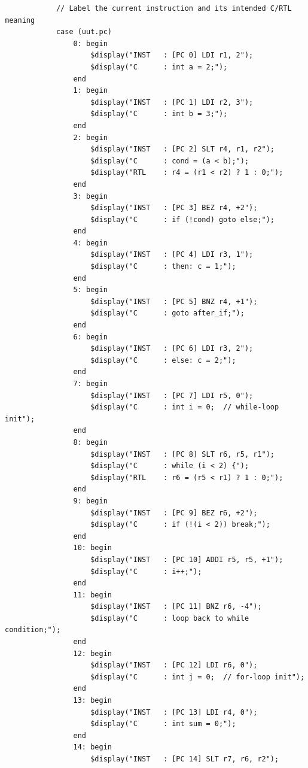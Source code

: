 \documentclass[12pt]{report}
\begin{document}
\begin{lstlisting}
            // Label the current instruction and its intended C/RTL meaning
            case (uut.pc)
                0: begin
                    $display("INST   : [PC 0] LDI r1, 2");
                    $display("C      : int a = 2;");
                end
                1: begin
                    $display("INST   : [PC 1] LDI r2, 3");
                    $display("C      : int b = 3;");
                end
                2: begin
                    $display("INST   : [PC 2] SLT r4, r1, r2");
                    $display("C      : cond = (a < b);");
                    $display("RTL    : r4 = (r1 < r2) ? 1 : 0;");
                end
                3: begin
                    $display("INST   : [PC 3] BEZ r4, +2");
                    $display("C      : if (!cond) goto else;");
                end
                4: begin
                    $display("INST   : [PC 4] LDI r3, 1");
                    $display("C      : then: c = 1;");
                end
                5: begin
                    $display("INST   : [PC 5] BNZ r4, +1");
                    $display("C      : goto after_if;");
                end
                6: begin
                    $display("INST   : [PC 6] LDI r3, 2");
                    $display("C      : else: c = 2;");
                end
                7: begin
                    $display("INST   : [PC 7] LDI r5, 0");
                    $display("C      : int i = 0;  // while-loop init");
                end
                8: begin
                    $display("INST   : [PC 8] SLT r6, r5, r1");
                    $display("C      : while (i < 2) {");
                    $display("RTL    : r6 = (r5 < r1) ? 1 : 0;");
                end
                9: begin
                    $display("INST   : [PC 9] BEZ r6, +2");
                    $display("C      : if (!(i < 2)) break;");
                end
                10: begin
                    $display("INST   : [PC 10] ADDI r5, r5, +1");
                    $display("C      : i++;");
                end
                11: begin
                    $display("INST   : [PC 11] BNZ r6, -4");
                    $display("C      : loop back to while condition;");
                end
                12: begin
                    $display("INST   : [PC 12] LDI r6, 0");
                    $display("C      : int j = 0;  // for-loop init");
                end
                13: begin
                    $display("INST   : [PC 13] LDI r4, 0");
                    $display("C      : int sum = 0;");
                end
                14: begin
                    $display("INST   : [PC 14] SLT r7, r6, r2");

\end{lstlisting}
\end{document}
